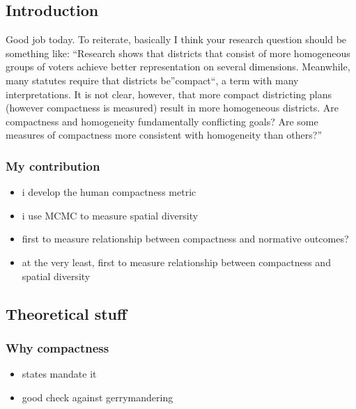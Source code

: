 \documentclass[]{article}
\author{Zhenghong Lieu}
\date{}
\providecommand{\tightlist}{%
  \setlength{\itemsep}{0pt}\setlength{\parskip}{0pt}}
\begin{document}
\hypertarget{introduction}{%
\subsection{Introduction}\label{introduction}}

Good job today. To reiterate, basically I think your research question
should be something like: ``Research shows that districts that consist
of more homogeneous groups of voters achieve better representation on
several dimensions. Meanwhile, many statutes require that districts
be''compact``, a term with many interpretations. It is not clear,
however, that more compact districting plans (however compactness is
measured) result in more homogeneous districts. Are compactness and
homogeneity fundamentally conflicting goals? Are some measures of
compactness more consistent with homogeneity than others?''

\hypertarget{my-contribution}{%
\subsubsection{My contribution}\label{my-contribution}}

\begin{itemize}
\tightlist
\item
  i develop the human compactness metric
\item
  i use MCMC to measure spatial diversity
\item
  first to measure relationship between compactness and normative
  outcomes?
\item
  at the very least, first to measure relationship between compactness
  and spatial diversity
\end{itemize}

\hypertarget{theoretical-stuff}{%
\subsection{Theoretical stuff}\label{theoretical-stuff}}

\hypertarget{why-compactness}{%
\subsubsection{Why compactness}\label{why-compactness}}

\begin{itemize}
\tightlist
\item
  states mandate it
\item
  good check against gerrymandering
\end{itemize}
\end{document}
